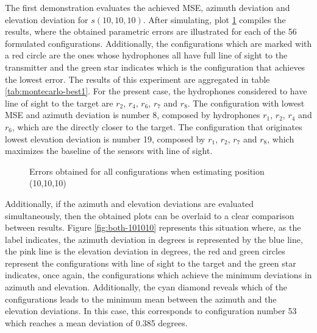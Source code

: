 The first demonstration evaluates the achieved MSE, azimuth deviation and elevation deviation for $s(10,10,10)$. After simulating, plot \ref{fig:errors-101010} compiles the results, where the obtained parametric errors are illustrated for each of the 56 formulated configurations. Additionally, the configurations which are marked with a red circle are the ones whose hydrophones all have full line of sight to the transmitter and the green star indicates which is the configuration that achieves the lowest error. The results of this experiment are aggregated in table \ref{tab:montecarlo-best1}. For the present case, the hydrophones considered to have line of sight to the target are $r_2$, $r_4$, $r_6$, $r_7$ and $r_8$. The configuration with lowest MSE and azimuth deviation is number 8, composed by hydrophones $r_1$, $r_2$, $r_4$ and $r_6$, which are the directly closer to the target. The configuration that originates lowest elevation deviation is number 19, composed by $r_1$, $r_2$, $r_7$ and $r_8$, which maximizes the baseline of the sensors with line of sight.

\begin{figure}[!htbp]
	\captionsetup{justification=centering,margin=2cm}
	\caption{Errors obtained for all configurations when estimating position (10,10,10)}
	\label{fig:errors-101010}
\end{figure}

Additionally, if the azimuth and elevation deviations are evaluated simultaneously, then the obtained plots can be overlaid to a clear comparison between results. Figure \ref{fig:both-101010} represents this situation where, as the label indicates, the azimuth deviation in degrees is represented by the blue line, the pink line is the elevation deviation in degrees, the red and green circles represent the configurations with line of sight to the target and the green star indicates, once again, the configurations which achieve the minimum deviations in azimuth and elevation. Additionally, the cyan diamond reveals which of the configurations leads to the minimum mean between the azimuth and the elevation deviations. In this case, this corresponds to configuration number 53 which reaches a mean deviation of 0.385 degrees. 

